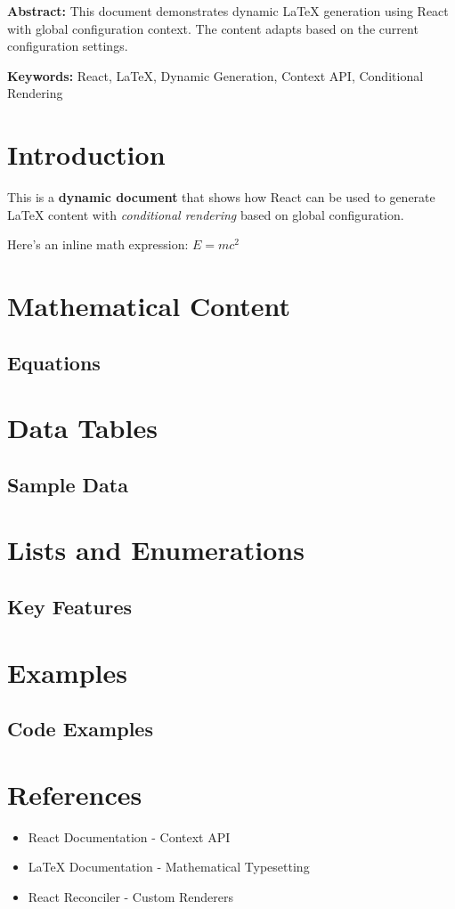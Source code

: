 \documentclass{article}
\begin{document}
\textbf{Abstract:} This document demonstrates dynamic LaTeX generation using React with global configuration context. The content adapts based on the current configuration settings.

\textbf{Keywords:} React, LaTeX, Dynamic Generation, Context API, Conditional Rendering

\section{Introduction}
This is a \textbf{dynamic document} that shows how React can be used to generate LaTeX content with \textit{conditional rendering} based on global configuration.

Here's an inline math expression: $E = mc^2$



\section{Mathematical Content}
\subsection{Equations}



\section{Data Tables}
\subsection{Sample Data}



\section{Lists and Enumerations}
\subsection{Key Features}



\section{Examples}
\subsection{Code Examples}



\section{References}
\begin{itemize}
\item React Documentation - Context API
\item LaTeX Documentation - Mathematical Typesetting
\item React Reconciler - Custom Renderers
\end{itemize}
\end{document}
